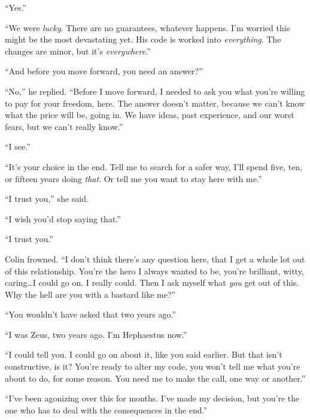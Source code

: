 ``Yes.''



``We were \emph{lucky}.  There are no guarantees, whatever happens.  I'm worried this might be the most devastating yet.  His code is worked into \emph{everything}.  The changes are minor, but it's \emph{everywhere}.''



``And before you move forward, you need an answer?''



``No,'' he replied.  ``Before I move forward, I needed to ask you what you're willing to pay for your freedom, here.  The answer doesn't matter, because we can't know what the price will be, going in.  We have ideas, past experience, and our worst fears, but we can't really know.''



``I see.''



``It's your choice in the end.  Tell me to search for a safer way, I'll spend five, ten, or fifteen years doing \emph{that}.  Or tell me you want to stay here with me.''



``I trust you,'' she said.



``I wish you'd stop saying that.''



``I trust you.''



Colin frowned.  ``I don't think there's any question here, that I get a whole lot out of this relationship.  You're the hero I always wanted to be, you're brilliant, witty, caring\ldots I could go on.  I really could.  Then I ask myself what \emph{you} get out of this.  Why the hell are you with a bastard like me?''



``You wouldn't have asked that two years ago.''



``I was Zeus, two years ago.  I'm Hephaestus now.''



``I could tell you.  I could go on about it, like you said earlier.  But that isn't constructive, is it?  You're ready to alter my code, you won't tell me what you're about to do, for some reason.  You need me to make the call, one way or another.''



``I've been agonizing over this for months.  I've made my decision, but you're the one who has to deal with the consequences in the end.''



